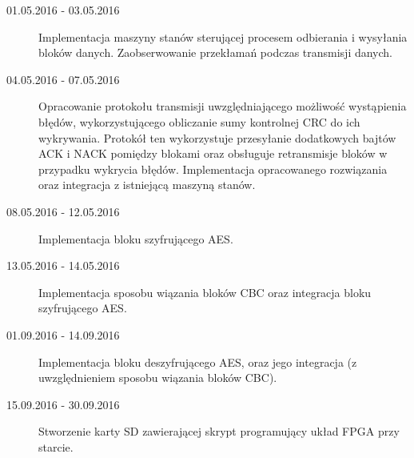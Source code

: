 \begin{description}
\item[01.05.2016 - 03.05.2016] Implementacja maszyny stanów sterującej procesem odbierania i wysyłania bloków danych. Zaobserwowanie przekłamań podczas transmisji danych.

\item[04.05.2016 - 07.05.2016] Opracowanie protokołu transmisji uwzględniającego możliwość wystąpienia błędów, wykorzystującego obliczanie sumy kontrolnej CRC do ich wykrywania. Protokół ten wykorzystuje przesyłanie dodatkowych bajtów ACK i NACK pomiędzy blokami oraz obsługuje retransmisje bloków w przypadku wykrycia błędów. Implementacja opracowanego rozwiązania oraz integracja z istniejącą maszyną stanów.

\item[08.05.2016 - 12.05.2016] Implementacja bloku szyfrującego AES.

\item[13.05.2016 - 14.05.2016] Implementacja sposobu wiązania bloków CBC oraz integracja bloku szyfrującego AES.

\item[01.09.2016 - 14.09.2016] Implementacja bloku deszyfrującego AES, oraz jego integracja (z uwzględnieniem sposobu wiązania bloków CBC).

\item[15.09.2016 - 30.09.2016] Stworzenie karty SD zawierającej skrypt programujący układ FPGA przy starcie.
\end{description}


